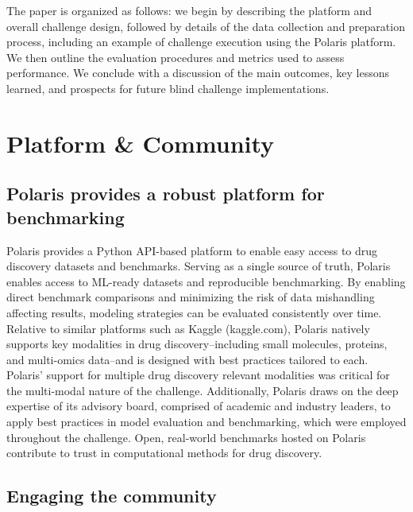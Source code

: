 \documentclass[journal=jcim,manuscript=article]{achemso}
\begin{document}
The paper is organized as follows: we begin by describing the platform and overall challenge design, followed by details of the data collection and preparation process, including an example of challenge execution using the Polaris platform. We then outline the evaluation procedures and metrics used to assess performance. We conclude with a discussion of the main outcomes, key lessons learned, and prospects for future blind challenge implementations.

\section{Platform \& Community}

\subsection{Polaris provides a robust platform for benchmarking}

 Polaris provides a Python API-based platform to enable easy access to drug discovery datasets and benchmarks. Serving as a single source of truth, Polaris enables access to ML-ready datasets and reproducible benchmarking\cite{Polaris_website, wognum_call_2024}. By enabling direct benchmark comparisons and minimizing the risk of data mishandling affecting results, modeling strategies can be evaluated consistently over time. Relative to similar platforms such as Kaggle (kaggle.com), Polaris natively supports key modalities in drug discovery--including small molecules, proteins, and multi-omics data--and is designed with best practices tailored to each. Polaris' support for multiple drug discovery relevant modalities was critical for the multi-modal nature of the challenge.  Additionally, Polaris draws on the deep expertise of its advisory board, comprised of academic and industry leaders, to apply best practices in model evaluation and benchmarking\cite{ash_practically_2024}, which were employed throughout the challenge. Open, real-world benchmarks hosted on Polaris contribute to trust in computational methods for drug discovery.

\subsection{Engaging the community}
\end{document}

